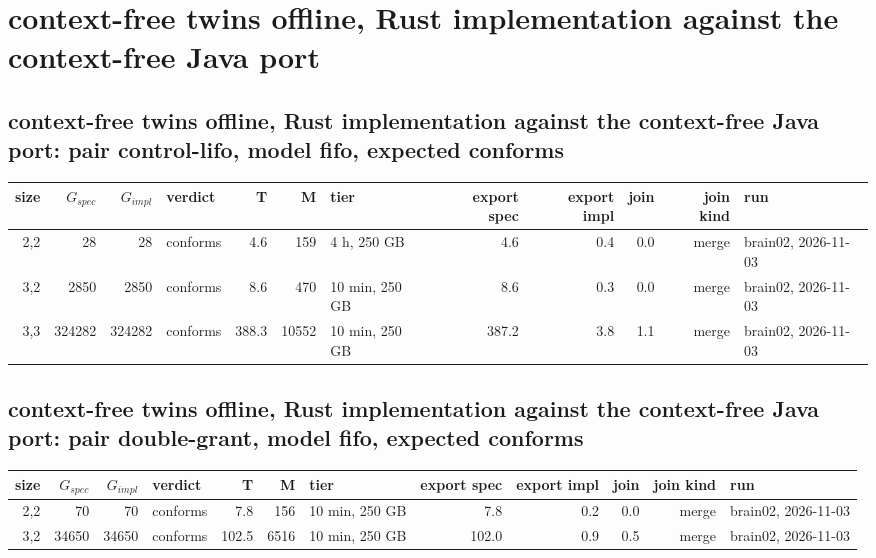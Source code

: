 \documentclass[10pt]{article}
\begin{document}
\section*{context-free twins offline, Rust implementation against the context-free Java port}
\subsection*{context-free twins offline, Rust implementation against the context-free Java port: pair \textsf{control-lifo}, model fifo, expected conforms}
\begin{longtable}{@{}rrrlrrlrrrrl@{}}
\toprule
size & $G_{\mathit{spec}}$ & $G_{\mathit{impl}}$ & verdict & T & M & tier & export spec & export impl & join & join kind & run \\
\midrule
\endhead
\color{blue} 2,2 & 28 & 28 & conforms & 4.6 & 159 & 4 h, 250 GB & 4.6 & 0.4 & 0.0 & merge & brain02, 2026-11-03 \\
\color{blue} 3,2 & 2850 & 2850 & conforms & 8.6 & 470 & 10 min, 250 GB & 8.6 & 0.3 & 0.0 & merge & brain02, 2026-11-03 \\
\color{blue} 3,3 & 324282 & 324282 & conforms & 388.3 & 10552 & 10 min, 250 GB & 387.2 & 3.8 & 1.1 & merge & brain02, 2026-11-03 \\
\bottomrule
\end{longtable}
\subsection*{context-free twins offline, Rust implementation against the context-free Java port: pair \textsf{double-grant}, model fifo, expected conforms}
\begin{longtable}{@{}rrrlrrlrrrrl@{}}
\toprule
size & $G_{\mathit{spec}}$ & $G_{\mathit{impl}}$ & verdict & T & M & tier & export spec & export impl & join & join kind & run \\
\midrule
\endhead
\color{blue} 2,2 & 70 & 70 & conforms & 7.8 & 156 & 10 min, 250 GB & 7.8 & 0.2 & 0.0 & merge & brain02, 2026-11-03 \\
\color{blue} 3,2 & 34650 & 34650 & conforms & 102.5 & 6516 & 10 min, 250 GB & 102.0 & 0.9 & 0.5 & merge & brain02, 2026-11-03 \\
\bottomrule
\end{longtable}
\end{document}
